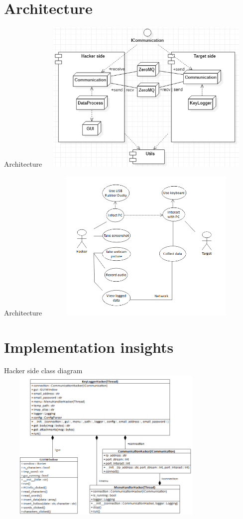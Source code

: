 \documentclass{beamer}
\begin{document}
\section{Architecture}
\begin{frame}[t]{Architecture}
\includegraphics[width=307pt, height=210pt]{../images/component diagram}
\end{frame}

\begin{frame}{Architecture}
\includegraphics[width=307pt, height=210pt]{../images/specific keylogger}
\end{frame}


\section{Implementation insights}
\begin{frame}[t]{Hacker side class diagram}
\includegraphics[width=307pt, height=210pt]{../images/hackerclassdiagram}
\end{frame}
\end{document}
